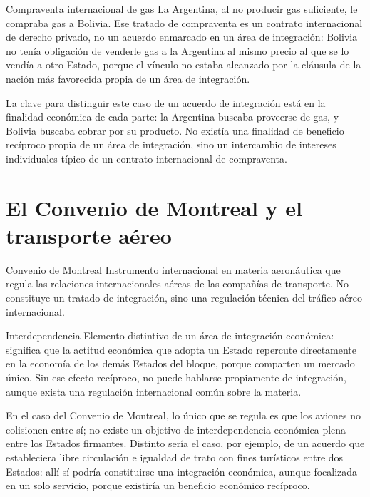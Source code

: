 \documentclass[12pt,oneside]{book}
\begin{document}
\begin{ejemplo}{Compraventa internacional de gas}
La Argentina, al no producir gas suficiente, le compraba gas a Bolivia. Ese tratado de compraventa es un contrato internacional de derecho privado, no un acuerdo enmarcado en un área de integración: Bolivia no tenía obligación de venderle gas a la Argentina al mismo precio al que se lo vendía a otro Estado, porque el vínculo no estaba alcanzado por la cláusula de la nación más favorecida propia de un área de integración.
\end{ejemplo}

La clave para distinguir este caso de un acuerdo de integración está en la finalidad económica de cada parte: la Argentina buscaba proveerse de gas, y Bolivia buscaba cobrar por su producto. No existía una finalidad de beneficio recíproco propia de un área de integración, sino un intercambio de intereses individuales típico de un contrato internacional de compraventa.

\section{El Convenio de Montreal y el transporte aéreo}

\begin{normacitada}{Convenio de Montreal}
Instrumento internacional en materia aeronáutica que regula las relaciones internacionales aéreas de las compañías de transporte. No constituye un tratado de integración, sino una regulación técnica del tráfico aéreo internacional.
\end{normacitada}

\begin{definicion}{Interdependencia}
Elemento distintivo de un área de integración económica: significa que la actitud económica que adopta un Estado repercute directamente en la economía de los demás Estados del bloque, porque comparten un mercado único. Sin ese efecto recíproco, no puede hablarse propiamente de integración, aunque exista una regulación internacional común sobre la materia.
\end{definicion}

En el caso del Convenio de Montreal, lo único que se regula es que los aviones no colisionen entre sí; no existe un objetivo de interdependencia económica plena entre los Estados firmantes. Distinto sería el caso, por ejemplo, de un acuerdo que estableciera libre circulación e igualdad de trato con fines turísticos entre dos Estados: allí sí podría constituirse una integración económica, aunque focalizada en un solo servicio, porque existiría un beneficio económico recíproco.
\end{document}
